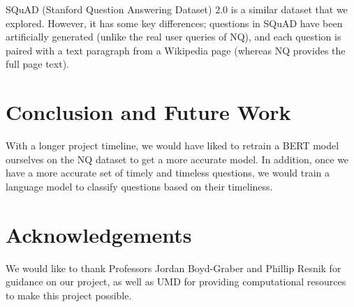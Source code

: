 \documentclass{article}
\begin{document}
SQuAD (Stanford Question Answering Dataset) 2.0 \cite{squaddataset} is a similar
dataset that we explored. However, it has some key differences; questions in
SQuAD have been artificially generated (unlike the real user queries of NQ), and
each question is paired with a text paragraph from a Wikipedia page (whereas NQ
provides the full page text).



\section{Conclusion and Future Work}
With a longer project timeline, we would have liked to retrain a BERT model
ourselves on the NQ dataset to get a more accurate model. In addition, once we
have a more accurate set of timely and timeless questions, we would train a
language model to classify questions based on their timeliness.


\section*{Acknowledgements}

We would like to thank Professors Jordan Boyd-Graber and Phillip Resnik for
guidance on our project, as well as UMD for providing computational resources to
make this project possible.




\end{document}
